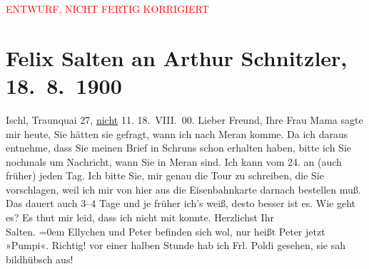 
\begin{center}
            \textcolor{red}{ENTWURF, NICHT FERTIG KORRIGIERT}
                      \end{center}
            
         
         \renewcommand{\erwaehntePersonen}{Personen: Caroline Kotter, Ottmar Peter Kotter, Leopoldine Müller, Louise Schnitzler}
         \renewcommand{\erwaehnteOrte}{Orte: Bad Ischl, Meran, Schruns, Traunkai}
         \renewcommand{\erwaehnteWerke}{}
               \section[Felix Salten an Arthur Schnitzler, 18. 8. 1900]{ Felix Salten an Arthur Schnitzler, 18. 8. 1900}\nopagebreak{}\rehead{ }\begin{ledgroupsized}[t]{13cm}\normalsize\beginnumbering \toendnotes[C]{\smallbreak\pagebreak[2]} 
\toendnotes[C]{\smallbreak}\pstart
           \raggedleft{}{\pb}Ischl, Traunquai 27, \uline{nicht} 11. \pend
           \pstart
           \raggedleft{}18. VIII. 00. \pend
           \pstart
           Lieber Freund, Ihre Frau Mama sagte mir heute, Sie hätten sie gefragt, wann ich nach Meran komme. Da ich daraus entnehme, dass Sie meinen Brief in Schruns schon erhalten haben, bitte ich Sie nochmals um
               Nachricht, wann Sie in Meran sind. Ich kann vom
                  24. an (auch früher) jeden Tag. Ich bitte Sie, mir genau die Tour zu
               schreiben, die Sie vorschlagen, weil ich mir von hier aus die Eisenbahnkarte darnach
               bestellen muß. Das dauert auch 3–4 Tage und je früher ich’s weiß, desto besser ist
               es. Wie geht es? Es thut mir leid, dass ich nicht mit konnte. \pend
           \pstart
            Herzlichst Ihr {\\[\baselineskip]}\spacefill\mbox{Salten.}\pend
           \leftskip=0em{}\pstart
           \noindent{}Ellychen und Peter
                  befinden sich wol, nur heißt Peter jetzt »Pumpi«. \pend
           \pstart
           Richtig! vor einer {\pb}halben
                  Stunde hab ich Frl. Poldi gesehen, sie sah
                  bildhübsch aus! \pend
           

\end{ledgroupsized}
